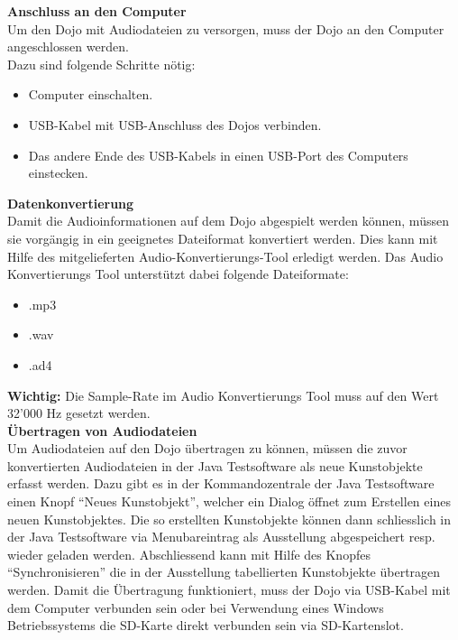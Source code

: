 \label{datenaustauschkapitel} 
\textbf{Anschluss an den Computer}
\\[4mm]
Um den Dojo mit Audiodateien zu versorgen, muss der Dojo an den Computer angeschlossen werden.
\\[4mm]
Dazu sind folgende Schritte nötig:
\begin{itemize}
\item Computer einschalten.
\end{itemize}
\begin{itemize}
\item USB-Kabel mit USB-Anschluss des Dojos verbinden.
\end{itemize}
\begin{itemize}
\item Das andere Ende des USB-Kabels in einen USB-Port des Computers einstecken.
\end{itemize}
\textbf{Datenkonvertierung}
\\[4mm]
Damit die Audioinformationen auf dem Dojo abgespielt werden können, müssen sie vorgängig in ein geeignetes Dateiformat konvertiert werden. Dies kann mit Hilfe des mitgelieferten Audio-Konvertierungs-Tool erledigt werden. Das Audio Konvertierungs Tool unterstützt dabei folgende Dateiformate:
\begin{itemize}
\item .mp3
\end{itemize}
\begin{itemize}
\item .wav
\end{itemize}
\begin{itemize}
\item .ad4
\end{itemize}
\textbf{Wichtig:} Die Sample-Rate im Audio Konvertierungs Tool muss auf den Wert 32'000 Hz gesetzt werden.
\\[4mm]
\textbf{Übertragen von Audiodateien}
\\[4mm]
Um Audiodateien auf den Dojo übertragen zu können, müssen die zuvor konvertierten Audiodateien in der Java Testsoftware als neue Kunstobjekte erfasst werden. Dazu gibt es in der Kommandozentrale der Java Testsoftware einen Knopf ``Neues Kunstobjekt'', welcher ein Dialog öffnet zum Erstellen eines neuen Kunstobjektes. Die so erstellten Kunstobjekte können dann schliesslich in der Java Testsoftware via Menubareintrag als Ausstellung abgespeichert resp. wieder geladen werden. Abschliessend kann mit Hilfe des Knopfes ``Synchronisieren'' die in der Ausstellung tabellierten Kunstobjekte übertragen werden. Damit die Übertragung funktioniert, muss der Dojo via USB-Kabel mit dem Computer verbunden sein oder bei Verwendung eines Windows Betriebssystems die SD-Karte direkt verbunden sein via SD-Kartenslot.
